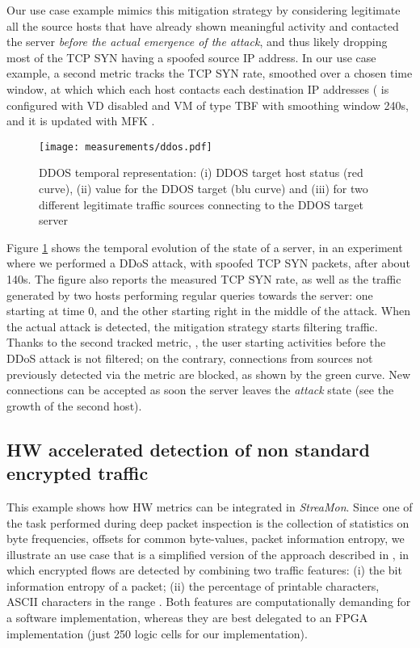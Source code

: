 \documentclass[conference,letterpaper]{sig-alternate-10pt}
\begin{document}
Our use case example mimics this mitigation strategy by considering legitimate all the source hosts that have already shown meaningful activity and contacted the server {\em before the actual emergence of the attack}, and thus likely dropping most of the TCP SYN having a spoofed source IP address. In our use case example, a second metric  tracks the TCP SYN rate, smoothed over a chosen time window, at which which each host contacts each destination IP addresses ( is configured with VD disabled and VM of type TBF with smoothing window 240s, and it is updated with MFK  .

\begin{figure}[t]
	\centering
	\texttt{[image: measurements/ddos.pdf]}
	\caption{DDOS temporal representation: (i) DDOS target host status (red curve), (ii)  value for the DDOS target (blu curve) and (iii)  for two different legitimate traffic sources connecting to the DDOS target server}
	\vspace*{-.5cm}
	\label{fig:DDOS}
\end{figure}

Figure \ref{fig:DDOS} shows the temporal evolution of the state of a server, in an experiment where we performed a DDoS attack, with spoofed TCP SYN packets, after about 140s. The figure also reports the measured TCP SYN rate, as well as the traffic generated by two hosts performing regular queries towards the server: one starting at time 0, and the other starting right in the middle of the attack.
When the actual attack is detected, the mitigation strategy starts filtering traffic. Thanks to the second tracked metric, , the user starting activities before the DDoS attack is not filtered; on the contrary, connections from sources not previously detected via the  metric are blocked, as shown by the green curve. New connections can be accepted as soon the server leaves the \emph{attack} state (see the  growth of the second host).

\subsection{HW accelerated detection of non standard encrypted traffic}
\label{s:entropy}
This example shows how HW metrics can be integrated in {\em StreaMon}. Since one of the task performed during deep packet inspection is the collection of statistics on byte frequencies, offsets for common byte-values, packet information entropy, we illustrate an use case that is a simplified version of the approach described in \cite{entropy}, in which encrypted flows are detected by combining two traffic features: (i) the bit information entropy of a packet; (ii) the percentage of printable characters,  ASCII characters in the range . Both features are computationally demanding for a software implementation, whereas they are best delegated to an FPGA implementation (just 250 logic cells for our implementation).
\end{document}
